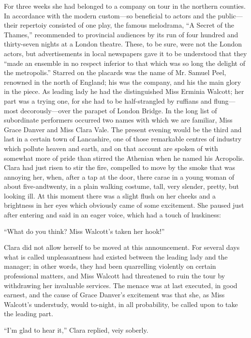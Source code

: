 For three weeks she had belonged to a company on tour in the northern
counties. In accordance with the modern custom---so beneficial to actors
and the public---their repertoiy consisted of one play, the famous
melodrama, ``A Secret of the Thames,'' recommended to provincial
audiences by its run of four hundred and thirty-seven nights at a London
theatre. These, to be sure, were {\protect\hypertarget{198}{}{}}not the
London actors, but advertisements in local newspapers gave it to be
understood that they ``made an ensemble in no respect inferior to that
which was so long the delight of the metropolis.'' Starred on the
placards was the name of Mr. Samuel Peel, renowned in the north of
England; his was the company, and his the main glory in the piece. As
leading lady he had the distinguished Miss Erminia Walcott; her part was
a trying one, for she had to be half-strangled by ruffians and
flung---most decorously---over the parapet of London Bridge. In the long
list of subordinate performers occurred two names with which we are
familiar, Miss Grace Danver and Miss Clara Vale. The present evening
would be the third and last in a certain town of Lancashire, one of
those remarkable centres of industry which pollute heaven and earth, and
on that account are spoken of with somewhat more of pride than stirred
the Athenian when he named his Acropolis. Clara had just risen to stir
the fire, compelled to move by the smoke that was
{\protect\hypertarget{199}{}{}}annoying her, when, after a tap at the
door, there carae in a young woman of about five-andtwenty, in a plain
walking costume, tall, very slender, pretty, but looking ill. At this
moment there was a slight flush on her cheeks and a brightness in her
eyes which obviously came of some excitement. She paused just after
entering and said in an eager voice, which had a touch of huskiness:

``What do you think? Miss Walcott's taken her hook!''

Clara did not allow herself to be moved at this announcement. For
several days what is called unpleasantness had existed between the
leading lady and the manager; in other words, they had been quarrelling
violently on certain professional matters, and Miss Walcott had
threatened to ruin the tour by withdrawing her invaluable services. The
menace was at last executed, in good earnest, and the cause of Grace
Danver's excitement was that she, as Miss Walcott's understudy, would
to-night, in all probability, be called upon to take the leading part.

{\protect\hypertarget{200}{}{}}``I'm glad to hear it,'' Clara replied,
veiy soberly.

